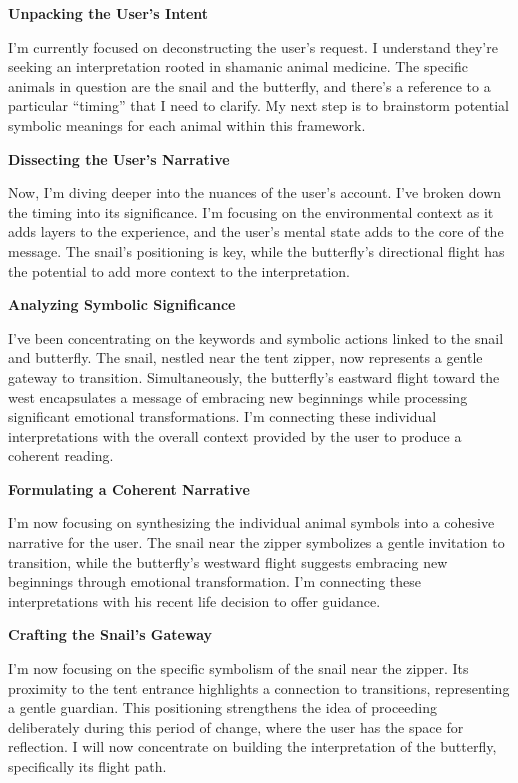 \documentclass{article}
\begin{document}
\textbf{Unpacking the User's Intent}

I'm currently focused on deconstructing the user's request. I understand
they're seeking an interpretation rooted in shamanic animal medicine.
The specific animals in question are the snail and the butterfly, and
there's a reference to a particular ``timing'' that I need to clarify.
My next step is to brainstorm potential symbolic meanings for each
animal within this framework.

\textbf{Dissecting the User's Narrative}

Now, I'm diving deeper into the nuances of the user's account. I've
broken down the timing into its significance. I'm focusing on the
environmental context as it adds layers to the experience, and the
user's mental state adds to the core of the message. The snail's
positioning is key, while the butterfly's directional flight has the
potential to add more context to the interpretation.

\textbf{Analyzing Symbolic Significance}

I've been concentrating on the keywords and symbolic actions linked to
the snail and butterfly. The snail, nestled near the tent zipper, now
represents a gentle gateway to transition. Simultaneously, the
butterfly's eastward flight toward the west encapsulates a message of
embracing new beginnings while processing significant emotional
transformations. I'm connecting these individual interpretations with
the overall context provided by the user to produce a coherent reading.

\textbf{Formulating a Coherent Narrative}

I'm now focusing on synthesizing the individual animal symbols into a
cohesive narrative for the user. The snail near the zipper symbolizes a
gentle invitation to transition, while the butterfly's westward flight
suggests embracing new beginnings through emotional transformation. I'm
connecting these interpretations with his recent life decision to offer
guidance.

\textbf{Crafting the Snail's Gateway}

I'm now focusing on the specific symbolism of the snail near the zipper.
Its proximity to the tent entrance highlights a connection to
transitions, representing a gentle guardian. This positioning
strengthens the idea of proceeding deliberately during this period of
change, where the user has the space for reflection. I will now
concentrate on building the interpretation of the butterfly,
specifically its flight path.
\end{document}
